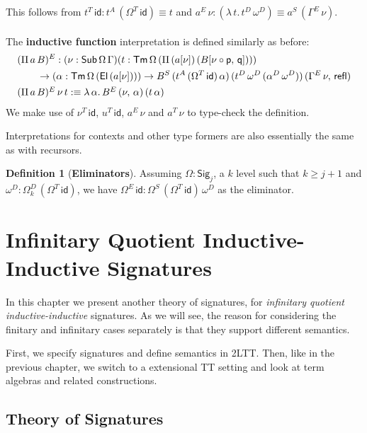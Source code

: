 \documentclass[12pt,a4paper,twoside,openany]{book}
\theoremstyle{remark}
\theoremstyle{definition}
\newtheorem{mydefinition}{Definition}
\theoremstyle{theorem}
\newcommand{\refl}{\mathsf{refl}}
\newcommand{\id}{\mathsf{id}}
\newcommand{\Sub}{\mathsf{Sub}}
\newcommand{\Tm}{\mathsf{Tm}}
\newcommand{\El}{\mathsf{El}}
\newcommand{\Sig}{\mathsf{Sig}}
\newcommand{\p}{\mathsf{p}}
\newcommand{\q}{\mathsf{q}}
\newcommand{\defn}{:\equiv}
\begin{document}
This follows from $t^T\,\id : t^A\,(\Omega^T\,\id) \equiv t$ and $a^E\,\nu : (\lambda\,t.\,t^D\,\omega^D) \equiv a^S\,(\Gamma^E\,\nu)$.
\\\\
\noindent The \textbf{inductive function} interpretation is defined similarly as before:
\begin{alignat*}{3}
 &(\Pi\,a\,B)^E : (\nu : \Sub\,\Omega\,\Gamma)(t : \Tm\,\Omega\,(\Pi\,(a[\nu])\,(B[\nu\circ\p,\,\q])))\\
 & \hspace{2em}\to (\alpha : \Tm\,\Omega\,(\El\,(a[\nu]))) \to B^S\,(t^A\,(\Omega^T\,\id)\,\alpha)\,(t^D\,\omega^D\,(\alpha^D\,\omega^D))\,(\Gamma^E\,\nu,\,\refl)\\
 &\rlap{$(\Pi\,a\,B)^E\,\nu\,t \defn \lambda\,\alpha.\,B^E\,(\nu,\,\alpha)\,(t\,\alpha)$}
\end{alignat*}
We make use of $\nu^T\,\id$, $u^T\,\id$, $a^E\,\nu$ and $a^T\,\nu$ to type-check the definition.

Interpretations for contexts and other type formers are also essentially the same as with recursors.

\begin{mydefinition}[\textbf{Eliminators}]
Assuming $\Omega : \Sig_j$, a $k$ level such that $k \geq j + 1$ and $\omega^D :
\Omega^D_{k}\,(\Omega^T\,\id)$, we have $\Omega^E\,\id : \Omega^S\,(\Omega^T\,\id)\,\omega^D$ as
the eliminator.
\end{mydefinition}


\chapter[Infinitary QII Signatures]{Infinitary Quotient Inductive-Inductive Signatures}
\label{chap:iqiit}

In this chapter we present another theory of signatures, for \emph{infinitary
quotient inductive-inductive} signatures. As we will see, the reason for
considering the finitary and infinitary cases separately is that they support
different semantics.

First, we specify signatures and define semantics in 2LTT. Then, like in the
previous chapter, we switch to a extensional TT setting and look at term
algebras and related constructions.

\section{Theory of Signatures}
\end{document}
